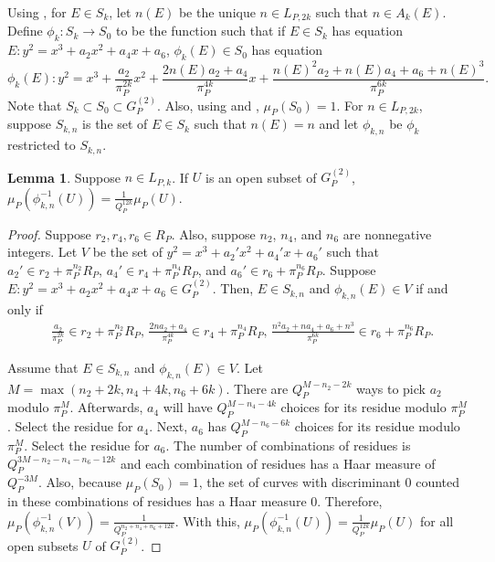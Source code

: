 \documentclass[12pt,letterpaper]{amsart}
\theoremstyle{definition}
\newtheorem{lemma}[theorem]{Lemma}
\begin{document}
Using , for $E\in S_k$, let $n(E)$ be the unique $n\in L_{P,2k}$ such that $n\in A_k(E)$. Define $\phi_k: S_k\rightarrow S_0$ to be the function such that if $E\in S_k$ has equation $E:y^2=x^3+a_2x^2+a_4x+a_6$, $\phi_k(E)\in S_0$ has equation
\[
\phi_k(E):y^2=x^3+\frac{a_2}{\pi_P^{2k}}x^2+\frac{2n(E)a_2+a_4}{\pi_P^{4k}}x+\frac{n(E)^2a_2+n(E)a_4+a_6+n(E)^3}{\pi_P^{6k}}.
\]
Note that $S_k\subset S_0\subset G_P^{(2)}$. Also, using  and , $\mu_P(S_0)=1$. For $n\in L_{P, 2k}$, suppose $S_{k,n}$ is the set of $E\in S_k$ such that $n(E)=n$ and let $\phi_{k,n}$ be $\phi_k$ restricted to $S_{k,n}$.

\begin{lemma}
\label{invdensitymult2a}
Suppose $n\in L_{P,k}$. If $U$ is an open subset of $G_P^{(2)}$, $\mu_P(\phi_{k,n}^{-1}(U))=\frac{1}{Q_P^{12k}}\mu_P(U)$.
\end{lemma}

\begin{proof}
Suppose $r_2, r_4, r_6\in R_P$. Also, suppose $n_2$, $n_4$, and $n_6$ are nonnegative integers. Let $V$ be the set of $y^2=x^3+a_2'x^2+a_4'x+a_6'$ such that $a_2'\in r_2+\pi_P^{n_2}R_P$, $a_4'\in r_4+ \pi_P^{n_4}R_P$, and $a_6'\in r_6+\pi_P^{n_6}R_P$. Suppose $E:y^2=x^3+a_2x^2+a_4x+a_6\in G_P^{(2)}$. 
Then, $E\in S_{k,n}$ and $\phi_{k,n}(E)\in V$ if and only if
\begin{align*}
& \frac{a_2}{\pi_P^{2k}}\in r_2+\pi_P^{n_2}R_P,\, \frac{2na_2+a_4}{\pi_P^{4k}}\in r_4+\pi_P^{n_4}R_P,\,\frac{n^2a_2+na_4+a_6+n^3}{\pi_P^{6k}}\in r_6+\pi_P^{n_6} R_P.
\end{align*}

Assume that $E\in S_{k,n}$ and $\phi_{k,n}(E)\in V$. Let $M=\max(n_2+2k, n_4+4k, n_6+6k)$. There are $Q_P^{M-n_2-2k}$ ways to pick $a_2$ modulo $\pi_P^M$. Afterwards, $a_4$ will have $Q_P^{M-n_4-4k}$ choices for its residue modulo $\pi_P^M$. Select the residue for $a_4$. Next, $a_6$ has $Q_P^{M-n_6-6k}$ choices for its residue modulo $\pi_P^M$. Select the residue for $a_6$. The number of combinations of residues is $Q_P^{3M-n_2-n_4-n_6-12k}$ and each combination of residues has a Haar measure of $Q_P^{-3M}$. Also, because $\mu_P(S_0)=1$, the set of curves with discriminant $0$ counted in these combinations of residues has a Haar measure $0$. Therefore, $\mu_P(\phi_{k,n}^{-1}(V))=\frac{1}{Q_P^{n_2+n_4+n_6+12k}}$. With this, $\mu_P(\phi_{k,n}^{-1}(U))=\frac{1}{Q_P^{12k}}\mu_P(U)$ for all open subsets $U$ of $G_P^{(2)}$.
\end{proof}
\end{document}
